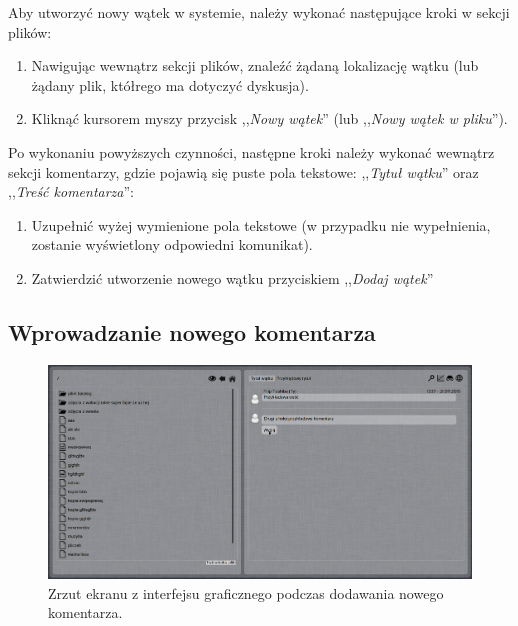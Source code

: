Aby utworzyć nowy wątek w systemie, należy wykonać następujące kroki w sekcji plików:

\begin{enumerate}[noitemsep]
  \item Nawigując wewnątrz sekcji plików, znaleźć żądaną lokalizację wątku (lub żądany plik, któłrego ma dotyczyć dyskusja).
  
  \item Kliknąć kursorem myszy przycisk ,,\emph{Nowy wątek}'' (lub ,,\emph{Nowy wątek w pliku}'').
\end{enumerate}

Po wykonaniu powyższych czynności, następne kroki należy wykonać wewnątrz sekcji komentarzy, gdzie pojawią się puste pola tekstowe: ,,\emph{Tytuł wątku}'' oraz ,,\emph{Treść komentarza}'':

\begin{enumerate}[noitemsep]
  \item Uzupełnić wyżej wymienione pola tekstowe (w przypadku nie wypełnienia, zostanie wyświetlony odpowiedni komunikat).
  
  \item Zatwierdzić utworzenie nowego wątku przyciskiem ,,\emph{Dodaj wątek}''
\end{enumerate}

\subsection*{Wprowadzanie nowego komentarza}

\begin{figure}[h!]
  \vspace{5pt}
  \begin{center}
    \includegraphics[width=400pt]{figures/screenshotnewcomment1.png}
  \end{center}
  \caption{Zrzut ekranu z interfejsu graficznego podczas dodawania nowego komentarza.}
\end{figure}

